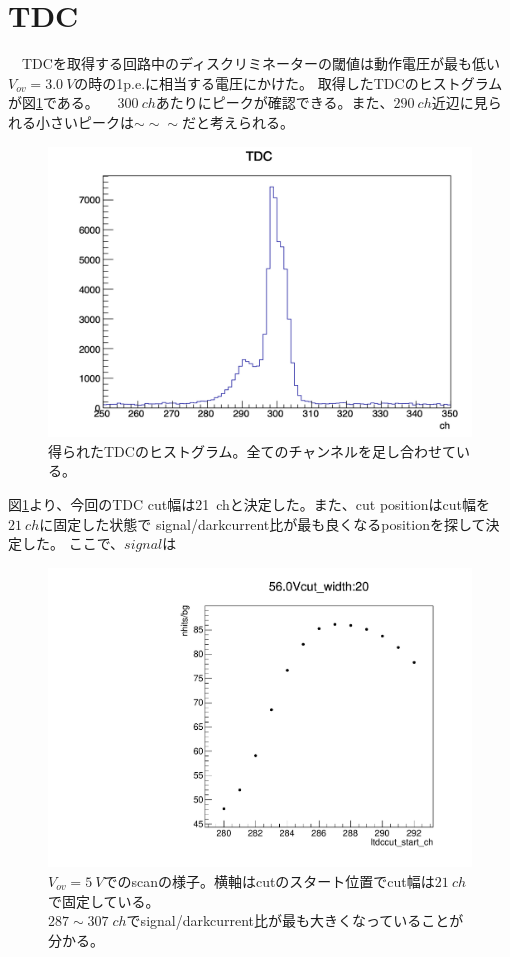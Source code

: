 \documentclass[uplatex, titlepage, dvipdfmx, 12pt, a4paper]{jsreport}
\begin{document}
  \section{TDC}
  　TDCを取得する回路中のディスクリミネーターの閾値は動作電圧が最も低い$V_{ov}=\SI{3.0}{V}$の時の1p.e.に相当する電圧にかけた。
    取得したTDCのヒストグラムが図\ref{fig:tdc}である。
  　$\SI{300}{ch}$あたりにピークが確認できる。また、$\SI{290}{ch}$近辺に見られる小さいピークは$\sim\sim\sim$だと考えられる。
  \begin{figure}[htbp]
    \begin{center} 
      \includegraphics[clip, scale=0.2]{image/tdc.png}
      \caption{得られたTDCのヒストグラム。全てのチャンネルを足し合わせている。}
      \label{fig:tdc} 
    \end{center}
  \end{figure}
  図\ref{fig:tdc}より、今回のTDC cut幅は\SI{21}{ch}と決定した。また、cut positionはcut幅を$\SI{21}{ch}$に固定した状態で
  signal/darkcurrent比が最も良くなるpositionを探して決定した。
  ここで、$signal$は
  \begin{figure}[bthp]
    \begin{center} 
      \includegraphics[clip, scale=0.25]{image/TDCcut_scan.pdf}
      \caption{$V_{ov}=\SI{5}{V}$でのscanの様子。横軸はcutのスタート位置でcut幅は$\SI{21}{ch}$で固定している。
      \\ $287\sim 307\;\si{ch}$でsignal/darkcurrent比が最も大きくなっていることが分かる。}
      \label{fig:tdc_scan} 
    \end{center}
  \end{figure}
\end{document}
